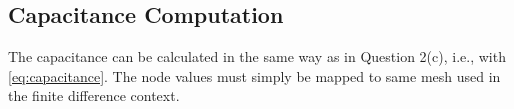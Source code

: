 \documentclass[a4paper,titlepage]{article}
\begin{document}
	\subsection{Capacitance Computation}
	
	The capacitance can be calculated in the same way as in Question 2(c), i.e., with \cref{eq:capacitance}. The node values must simply be mapped to same mesh used in the finite difference context.
	
%
	
	\onecolumn
	
\end{document}
